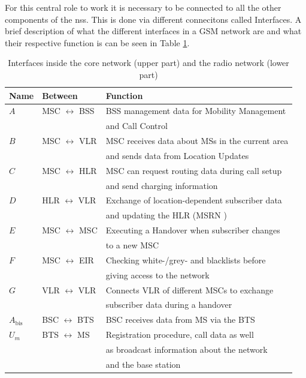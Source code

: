 For this central role to work it is necessary to be connected to all the other components of the \gls{nss}.
This is done via different connecitons called Interfaces.
A brief description of what the different interfaces in a GSM network are and what their respective function is can be seen in Table \ref{tab:interfaces}.

\begin{table}
\centering
\begin{tabular}{lll}
\toprule
Name			&Between					&Function\\
\midrule
$A$				&MSC $\leftrightarrow$ BSS	&BSS management data for Mobility Management\\
				&							&and Call Control\\
$B$				&MSC $\leftrightarrow$ VLR	&MSC receives data about MSs in the current area\\
				&							& and sends data from Location Updates\\
$C$				&MSC $\leftrightarrow$ HLR	&MSC can request routing data during call setup\\
				&							&and send \eg charging information\\
$D$				&HLR $\leftrightarrow$ VLR	&Exchange of location-dependent subscriber data\\
				&							&and updating the HLR (MSRN \etc)\\
$E$				&MSC $\leftrightarrow$ MSC	&Executing a Handover when subscriber changes\\
				&							&to a new MSC\\
$F$				&MSC $\leftrightarrow$ EIR	&Checking white-/grey- and blacklists before\\
				&							&giving access to the network\\
$G$				&VLR $\leftrightarrow$ VLR	&Connects VLR of different MSCs to exchange\\
				&							&subscriber data during a handover\\
\midrule
$A_\text{bis}$	&BSC $\leftrightarrow$ BTS	&BSC receives data from MS via the BTS\\
$U_m$			&BTS $\leftrightarrow$ MS	&Registration procedure, call data \etc as well\\
				&							&as broadcast information about the network\\
				&							&and the base station\\
\bottomrule
\end{tabular}
\caption{Interfaces inside the core network (upper part) and the radio network (lower part)}
\label{tab:interfaces}
\end{table}

